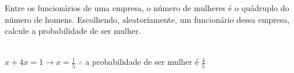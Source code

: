 \begin{ex}
Entre os funcionários de uma empresa, o número de mulheres é o quádruplo do número de homens. Escolhendo, aleatoriamente, um funcionário dessa empresa, calcule a probabilidade de ser mulher.
  \begin{sol}
   \phantom{A} \\
   $x+4x=1 \rightarrow x=\frac{1}{5}$\hspace{0,4cm}
   $\therefore$ a probabilidade de ser mulher é $\frac{4}{5}$
  \end{sol}
\end{ex}